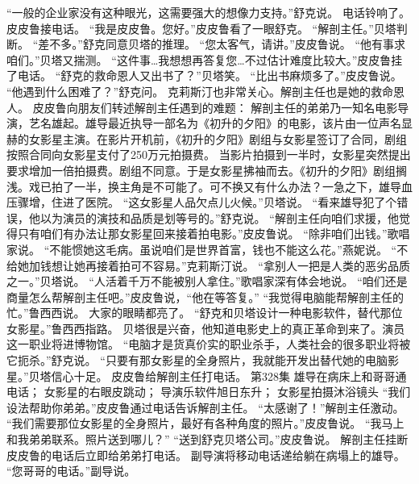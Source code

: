 \documentclass[a4paper,12pt,UTF8,twoside]{ctexbook}
\begin{document}
        “一般的企业家没有这种眼光，这需要强大的想像力支持。”舒克说。  
        电话铃响了。  
        皮皮鲁接电话。  
        “我是皮皮鲁。您好。”皮皮鲁看了一眼舒克。  
        “解剖主任。”贝塔判断。  
        “差不多。”舒克同意贝塔的推理。  
        “您太客气，请讲。”皮皮鲁说。  
        “他有事求咱们。”贝塔又揣测。        
        “这件事…我想想再答复您…不过估计难度比较大。”皮皮鲁挂了电话。  
        “舒克的救命恩人又出书了？”贝塔笑。  
        “比出书麻烦多了。”皮皮鲁说。  
        “他遇到什么困难了？”舒克问。  
        克莉斯汀也非常关心。解剖主任也是她的救命恩人。  
        皮皮鲁向朋友们转述解剖主任遇到的难题：  
        解剖主任的弟弟乃一知名电影导演，艺名雄起。雄导最近执导一部名为《初升的夕阳》的电影，该片由一位声名显赫的女影星主演。在影片开机前，《初升的夕阳》剧组与女影星签订了合同，剧组按照合同向女影星支付了250万元拍摄费。  
        当影片拍摄到一半时，女影星突然提出要求增加一倍拍摄费。剧组不同意。于是女影星拂袖而去。《初升的夕阳》剧组搁浅。戏已拍了一半，换主角是不可能了。可不换又有什么办法？一急之下，雄导血压骤增，住进了医院。  
        “这女影星人品欠点儿火候。”贝塔说。  
        “看来雄导犯了个错误，他以为演员的演技和品质是划等号的。”舒克说。  
        “解剖主任向咱们求援，他觉得只有咱们有办法让那女影星回来接着拍电影。”皮皮鲁说。  
        “除非咱们出钱。”歌唱家说。        
        “不能惯她这毛病。虽说咱们是世界首富，钱也不能这么花。”燕妮说。  
        “不给她加钱想让她再接着拍可不容易。”克莉斯汀说。  
        “拿别人一把是人类的恶劣品质之一。”贝塔说。  
        “人活着千万不能被别人拿住。”歌唱家深有体会地说。  
        “咱们还是商量怎么帮解剖主任吧。”皮皮鲁说，“他在等答复。”  
        “我觉得电脑能帮解剖主任的忙。”鲁西西说。  
        大家的眼睛都亮了。  
        “舒克和贝塔设计一种电影软件，替代那位女影星。”鲁西西指路。  
        贝塔很是兴奋，他知道电影史上的真正革命到来了。演员这一职业将进博物馆。  
        “电脑才是货真价实的职业杀手，人类社会的很多职业将被它扼杀。”舒克说。  
        “只要有那女影星的全身照片，我就能开发出替代她的电脑影星。”贝塔信心十足。  
        皮皮鲁给解剖主任打电话。          第328集  
        雄导在病床上和哥哥通电话；  
        女影星的右眼皮跳动；  
        导演乐软件旭日东升；  
        女影星拍摄沐浴镜头    
        “我们设法帮助你弟弟。”皮皮鲁通过电话告诉解剖主任。  
        “太感谢了！”解剖主任激动。  
        “我们需要那位女影星的全身照片，最好有各种角度的照片。”皮皮鲁说。  
        “我马上和我弟弟联系。照片送到哪儿？”  
        “送到舒克贝塔公司。”皮皮鲁说。  
        解剖主任挂断皮皮鲁的电话后立即给弟弟打电话。  
        副导演将移动电话递给躺在病塌上的雄导。  
        “您哥哥的电话。”副导说。        
\end{document}
